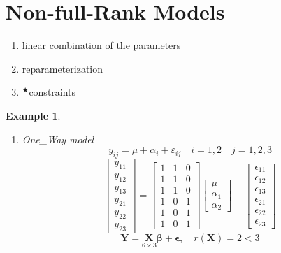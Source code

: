 \documentclass{article}
\newtheorem{example}[theorem]{Example}
\begin{document}
\section{Non-full-Rank Models}

\begin{enumerate}
\item linear combination of the parameters

\item reparameterization

\item $^{\bigstar }$constraints
\end{enumerate}

\bigskip

\begin{example}
\begin{enumerate}
\item One\_Way model%
\begin{equation*}
y_{ij}=\mu +\alpha _{i}+\varepsilon _{ij}\quad i=1,2\quad j=1,2,3
\end{equation*}%
\begin{equation*}
\left[ 
\begin{array}{c}
y_{11} \\ 
y_{12} \\ 
y_{13} \\ 
y_{21} \\ 
y_{22} \\ 
y_{23}%
\end{array}%
\right] =\left[ 
\begin{array}{ccc}
1 & 1 & 0 \\ 
1 & 1 & 0 \\ 
1 & 1 & 0 \\ 
1 & 0 & 1 \\ 
1 & 0 & 1 \\ 
1 & 0 & 1%
\end{array}%
\right] \left[ 
\begin{array}{c}
\mu \\ 
\alpha _{1} \\ 
\alpha _{2}%
\end{array}%
\right] +\left[ 
\begin{array}{c}
\epsilon _{11} \\ 
\epsilon _{12} \\ 
\epsilon _{13} \\ 
\epsilon _{21} \\ 
\epsilon _{22} \\ 
\epsilon _{23}%
\end{array}%
\right]
\end{equation*}%
\newline
\newline
\begin{equation*}
\mathbf{Y=}\underset{6\times 3}{\mathbf{X}}\mathbf{\beta +\epsilon },\quad
r\left( \mathbf{X}\right) =2<3
\end{equation*}


\end{enumerate}
\end{example}
\end{document}
